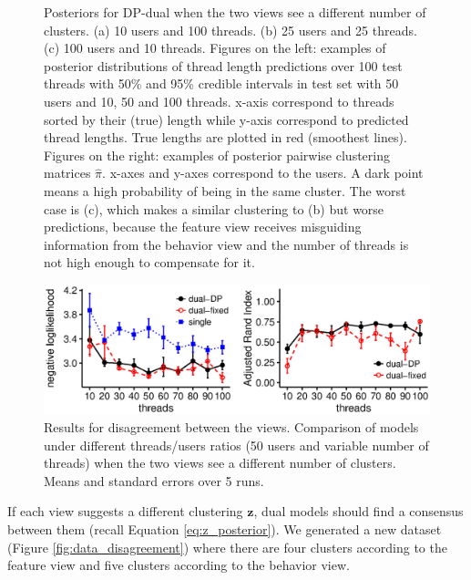 \documentclass[smallextended]{svjour3}          %
\begin{document}
\begin{figure}
	\centering
	\caption{Posteriors for DP-dual when the two views see a different number of clusters. (a) 10 users and 100 threads. (b) 25 users and 25 threads. (c) 100 users and 10 threads. Figures on the left: examples of posterior distributions of thread length predictions over 100 test threads with 50\% and 95\% credible intervals in test set with 50 users and 10, 50 and 100 threads. x-axis correspond to threads sorted by their (true) length while y-axis correspond to predicted thread lengths. True lengths are plotted in red (smoothest lines). Figures on the right: examples of posterior pairwise clustering matrices $\hat{\pi}$. x-axes and y-axes correspond to the users. A dark point means a high probability of being in the same cluster. The worst case is (c), which makes a similar clustering to (b) but worse predictions, because the feature view receives misguiding information from the behavior view and the number of threads is not high enough to compensate for it.}
	\label{fig:confused}
\end{figure}

\begin{figure}
	\centering

	\includegraphics[width=1\textwidth]{Fig6_results_disagreement_bw}%
	\caption{Results for disagreement between the views. Comparison of models under different threads/users ratios (50 users and variable number of threads) when the two views see a different number of clusters. Means and standard errors over 5 runs.}
	\label{fig:results_disagreement}
\end{figure}



If each view suggests a different clustering $\mathbf{z}$, dual models should find a consensus between them (recall Equation \ref{eq:z_posterior}). We generated a new dataset (Figure \ref{fig:data_disagreement}) where there are four clusters according to the feature view and five clusters according to the behavior view.
\end{document}
